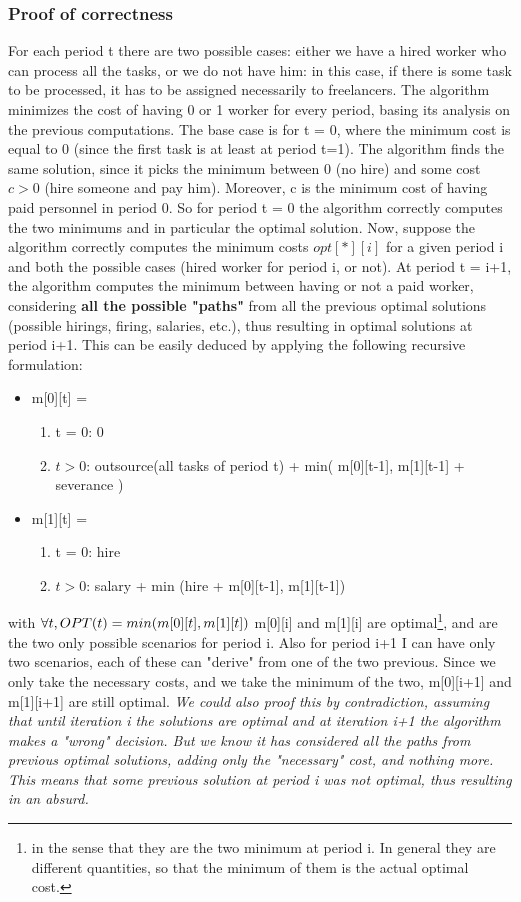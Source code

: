 \subsubsection{Proof of correctness}
For each period t there are two possible cases: either we have a hired worker who can process all the tasks, or we do not have him: in this case, if there is some task to be processed, it has to be assigned necessarily to freelancers. The algorithm minimizes the cost of having 0 or 1 worker for every period, basing its analysis on the previous computations. The base case is for t = 0, where the minimum cost is equal to 0 (since the first task is at least at period t=1). The algorithm finds the same solution, since it picks the minimum between 0 (no hire) and some cost $c > 0$ (hire someone and pay him). Moreover, c is the minimum cost of having paid personnel in period 0. So for period t = 0 the algorithm correctly computes the two minimums and in particular the optimal solution. Now, suppose the algorithm correctly computes the minimum costs $opt[*][i]$ for a given period i and both the possible cases (hired worker for period i, or not). At period t = i+1, the algorithm computes the minimum between having or not a paid worker, considering \textbf{all the possible "paths"} from all the previous optimal solutions (possible hirings, firing, salaries, etc.), thus resulting in optimal solutions at period i+1. This can be easily deduced by applying the following recursive formulation:
\begin{itemize}
	\item m[0][t] = 
	\begin{enumerate}
		\item t = 0: 0
		\item $t > 0$: outsource(all tasks of period t) + min( m[0][t-1], m[1][t-1] + severance )
	\end{enumerate}
	\item m[1][t] = 
	\begin{enumerate}
		\item t = 0: hire
		\item $t > 0$: salary + min (hire + m[0][t-1], m[1][t-1])
	\end{enumerate}
\end{itemize}
with $\forall t, OPT(t) = min (m[0][t], m[1][t]) \newline\newline$
m[0][i] and m[1][i] are optimal\footnote{in the sense that they are the two minimum at period i. In general they are different quantities, so that the minimum of them is the actual optimal cost.}, and are the two only possible scenarios for period i. Also for period i+1 I can have only two scenarios, each of these can "derive" from one of the two previous. Since we only take the necessary costs, and we take the minimum of the two, m[0][i+1] and m[1][i+1] are still optimal.
\textit{We could also proof this by contradiction, assuming that until iteration i the solutions are optimal and at iteration i+1 the algorithm makes a "wrong" decision. But we know it has considered all the paths from previous optimal solutions, adding only the "necessary" cost, and nothing more. This means that some previous solution at period i was not optimal, thus resulting in an absurd. 
}
